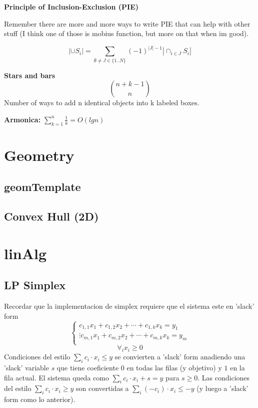 \documentclass[landscape, 9pt, a4paper, oneside, twocolumn]{extarticle}
\begin{document}
	\textbf{Principle of Inclusion-Exclusion (PIE)}
	
	Remember there are more and more ways to write PIE that can help with other stuff (I think one of those is mobius function, but more on that when im good).
	
	\[\left\lvert\cup S_i\right\rvert = \sum_{\emptyset\neq J\in\{1..N\}}(-1)^{\lvert J\rvert-1}\left\lvert \cap_{i\in J}S_i\right\rvert\]
	
	\textbf{Stars and bars}
	\[\binom{n+k-1}{n}\]
	Number of ways to add n identical objects into k labeled boxes.
	
	\textbf{Armonica: } \(\sum_{k=1}^{n}\frac{1}{k} = O(lg n)\)

\section{Geometry}
	\subsection{geomTemplate}
	
	\subsection{Convex Hull (2D)}
	
\section{linAlg}
	\subsection{LP Simplex}
	Recordar que la implementacion de simplex requiere que el sistema este en 'slack' form
	\[\begin{cases}
		c_{1,1}x_1+c_{1,2}x_2+\cdots+c_{1,k}x_k=y_1\\
		\vdots
		c_{m,1}x_1+c_{m,2}x_2+\cdots+c_{m,k}x_k=y_m\\
	\end{cases}\]
	\[\forall_i x_i\geq 0\]
	Condiciones del estilo $\sum_i c_i\cdot x_i \leq y$ se convierten a 'slack' form anadiendo una 'slack' variable $s$ que tiene coeficiente $0$ en todas las filas (y objetivo) y $1$ en la fila actual. El sistema queda como $\sum_i c_i\cdot x_i +s=y$ para $s\geq 0$. Las condiciones del estilo $\sum_i c_i\cdot x_i \geq y$ son convertidas a $\sum_i (-c_i)\cdot x_i \leq -y$ (y luego a 'slack' form como lo anterior).
	
\end{document}
